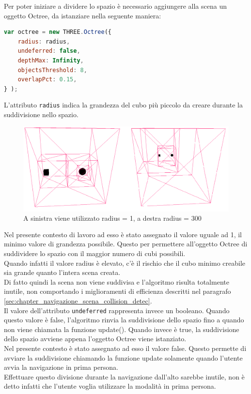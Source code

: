 Per poter iniziare a dividere lo spazio è necessario aggiungere alla scena un oggetto Octree, da istanziare nella seguente maniera:
\begin{lstlisting}[language=javascript]
var octree = new THREE.Octree({
    radius: radius, 
    undeferred: false,
    depthMax: Infinity,
    objectsThreshold: 8,
    overlapPct: 0.15,
} );
\end{lstlisting}

L'attributo \texttt{radius} indica la grandezza del cubo più piccolo da creare durante la suddivisione nello spazio.
\begin{figure}[htb]
 \centering
 \includegraphics[width=1\linewidth]{images/chapter_navigazione_scena/boxradius.png}\hfill
 \caption[Octree radius.]{A sinistra viene utilizzato radius = 1, a destra radius = 300}
 \label{fig:navigazione_scena_collision_boxradius}
\end{figure}

Nel presente contesto di lavoro ad esso è stato assegnato il valore uguale ad 1, il minimo valore di grandezza possibile. 
Questo per permettere all’oggetto Octree di suddividere lo spazio con il maggior numero di cubi possibili.
\\
Quando infatti il valore radius è elevato, c’è il rischio che il cubo minimo creabile sia grande quanto l’intera scena creata.
\\ 
Di fatto quindi la scena non viene suddivisa e l’algoritmo risulta totalmente inutile, non comportando i miglioramenti di efficienza descritti nel paragrafo \ref{sec:chapter_navigazione_scena_collision_detec}.
\\

Il valore dell’attributo \texttt{undeferred} rappresenta invece un booleano. 
Quando questo valore è false, l’algoritmo rinvia la suddivisione dello spazio fino a quando non viene chiamata la funzione update(). Quando invece è true, la suddivisione dello spazio avviene appena l’oggetto Octree viene istanziato.
\\
Nel presente contesto è stato assegnato ad esso il valore false. Questo permette di avviare la suddivisione chiamando la funzione update solamente quando l’utente avvia la navigazione in prima persona.
\\
Effettuare questo divisione durante la navigazione dall’alto sarebbe inutile, non è detto infatti che l’utente voglia utilizzare la modalità in prima persona.
\\

